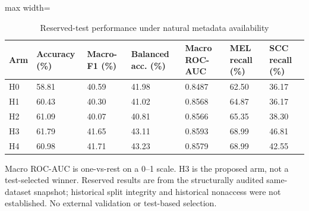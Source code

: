 \begin{table}[t]
\centering
\small
\caption{Reserved-test performance under natural metadata availability}
\label{tab:05-reserved-natural-performance}
\begin{adjustbox}{max width=\textwidth}
\begin{tabular}{lllllll}
\toprule
\textbf{Arm} & \textbf{Accuracy (\%)} & \textbf{Macro-F1 (\%)} & \textbf{Balanced acc. (\%)} & \textbf{Macro ROC-AUC} & \textbf{MEL recall (\%)} & \textbf{SCC recall (\%)} \\
\midrule
H0 & 58.81 & 40.59 & 41.98 & 0.8487 & 62.50 & 36.17 \\
H1 & 60.43 & 40.30 & 41.02 & 0.8568 & 64.87 & 36.17 \\
H2 & 61.09 & 40.07 & 40.81 & 0.8566 & 65.35 & 38.30 \\
H3 & 61.79 & 41.65 & 43.11 & 0.8593 & 68.99 & 46.81 \\
H4 & 60.98 & 41.71 & 43.23 & 0.8579 & 68.99 & 42.55 \\
\bottomrule
\end{tabular}
\end{adjustbox}
\par\smallskip
\begin{minipage}{\textwidth}\footnotesize Macro ROC-AUC is one-vs-rest on a 0--1 scale. H3 is the proposed arm, not a test-selected winner. Reserved results are from the structurally audited same-dataset snapshot; historical split integrity and historical nonaccess were not established. No external validation or test-based selection.\end{minipage}
\end{table}
